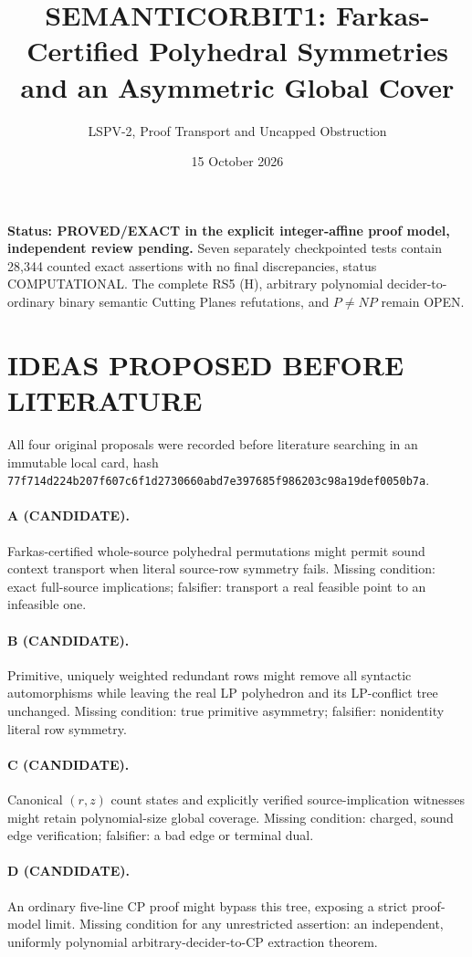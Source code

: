 \documentclass[11pt]{article}
\title{SEMANTICORBIT1: Farkas-Certified Polyhedral Symmetries and an Asymmetric Global Cover}
\author{LSPV-2, Proof Transport and Uncapped Obstruction}
\date{15 October 2026}
\begin{document}
\maketitle
\noindent\textbf{Status: PROVED/EXACT in the explicit integer-affine proof model, independent review pending.} Seven separately checkpointed tests contain 28,344 counted exact assertions with no final discrepancies, status COMPUTATIONAL. The complete RS5 (H), arbitrary polynomial decider-to-ordinary binary semantic Cutting Planes refutations, and $P\ne NP$ remain OPEN.

\section{IDEAS PROPOSED BEFORE LITERATURE}
All four original proposals were recorded before literature searching in an immutable local card, hash \texttt{77f714d224b207f607c6f1d2730660abd7e397685f986203c98a19def0050b7a}.
\paragraph{A (CANDIDATE).} Farkas-certified whole-source polyhedral permutations might permit sound context transport when literal source-row symmetry fails. Missing condition: exact full-source implications; falsifier: transport a real feasible point to an infeasible one.
\paragraph{B (CANDIDATE).} Primitive, uniquely weighted redundant rows might remove all syntactic automorphisms while leaving the real LP polyhedron and its LP-conflict tree unchanged. Missing condition: true primitive asymmetry; falsifier: nonidentity literal row symmetry.
\paragraph{C (CANDIDATE).} Canonical $(r,z)$ count states and explicitly verified source-implication witnesses might retain polynomial-size global coverage. Missing condition: charged, sound edge verification; falsifier: a bad edge or terminal dual.
\paragraph{D (CANDIDATE).} An ordinary five-line CP proof might bypass this tree, exposing a strict proof-model limit. Missing condition for any unrestricted assertion: an independent, uniformly polynomial arbitrary-decider-to-CP extraction theorem.
\end{document}
